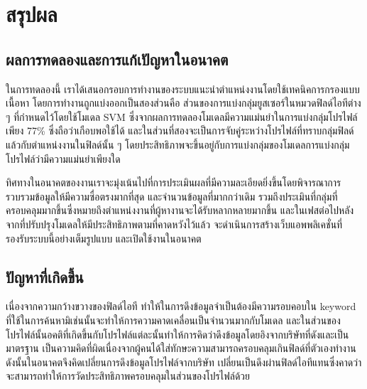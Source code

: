 \chapter{สรุปผล}
\label{chapter:conclusion}

\section{ผลการทดลองและการแก้เปัญหาในอนาคต}
ในการทดลองนี้ เราได้เสนอกรอบการทำงานของระบบแนะนำตำแหน่งงานโดยใช้เทคนิคการกรองแบบเนื้อหา โดยการทำงานถูกแบ่งออกเป็นสองส่วนคือ ส่วนของการแบ่งกลุ่มยูสเซอร์ในหมวดฟิลด์ไอทีต่าง ๆ ที่กำหนดไว้โดยใช้โมเดล SVM ซึ่งจากผลการทดลองโมเดลมีความแม่นยำในการแบ่งกลุ่มโปรไฟล์เพียง 77\% ซึ่งถือว่าเกือบพอใช้ได้ และในส่วนที่สองจะเป็นการจับคู่ระหว่างโปรไฟล์ที่ทราบกลุ่มฟิลด์แล้วกับตำแหน่งงานในฟิลด์นั้น ๆ โดยประสิทธิภาพจะขึ้นอยู่กับการแบ่งกลุ่มของโมเดลการแบ่งกลุ่มโปรไฟล์ว่ามีความแม่นยำเพียงใด

ทิศทางในอนาคตของงานเราจะมุ่งเน้นไปที่การประเมินผลที่มีความละเอียดยิ่งขึ้นโดยพิจารณาการรวบรวมข้อมูลให้มีความซื่อตรงมากที่สุด และจำนวนข้อมูลที่มากกว่าเดิม รวมถึงประเมินที่กลุ่มที่ครอบคลุมมากขึ้นซึ่งหมายถึงตำแหน่งงานที่ผู้หางานจะได้รับหลากหลายมากขึ้น
และในเฟสต่อไปหลังจากที่ปรับปรุงโมเดลให้มีประสิทธิภาพตามที่คาดหวังไว้แล้ว จะดำเนินการสร้างเว็บแอพพลิเคชั่นที่รองรับระบบนี้อย่างเต็มรูปแบบ และเปิดใช้งานในอนาคต

\section{ปัญหาที่เกิดขึ้น}
เนื่องจากความกว้างขวางของฟิลด์ไอที ทำให้ในการดึงข้อมูลจำเป็นต้องมีความรอบคอบใน keyword ที่ใช้ในการค้นหามิเช่นนั้นจะทำให้การความคาดเคลื่อนเป็นจำนวนมากกับโมเดล และในส่วนของโปรไฟล์นั้นอคติที่เกิดขึ้นกับโปรไฟล์แต่ละนั้นทำให้การคิดว่าดึงข้อมูลโดยอิงจากบริษัทที่ดังและเป็นมาตรฐาน เป็นความคิดที่ผิดเนื่องจากผู้คนได้ใส่ทักษะความสามารถครอบคลุมเกินฟิลด์ที่ตัวเองทำงาน ดังนั้นในอนาคตจึงคิดเปลี่ยนการดึงข้อมูลโปรไฟล์จากบริษัท เปลี่ยนเป็นดึงผ่านฟิลด์ไอทีแทนซึ่งคาดว่าจะสามารถทำให้การวัดประสิทธิภาพครอบคลุมในส่วนของโปรไฟล์ด้วย